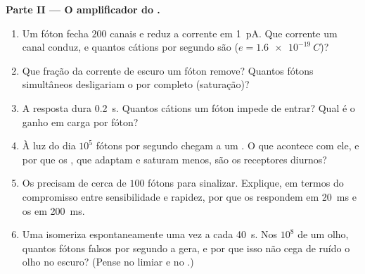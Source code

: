 \begin{problem}
\medskip
\noindent\textbf{Parte II --- O amplificador do .}
\begin{enumerate}[resume]
  \item Um fóton fecha $200$ canais e reduz a corrente em \qty{1}{pA}.
        Que corrente um canal conduz, e quantos cátions por segundo são
        ($e = \qty{1.6e-19}{C}$)?
  \item Que fração da corrente de escuro um fóton remove? Quantos fótons
        simultâneos desligariam o  por completo (saturação)?
  \item A resposta dura \qty{0.2}{s}. Quantos cátions um fóton impede de
        entrar? Qual é o ganho em carga por fóton?
  \item À luz do dia $10^{5}$ fótons por segundo chegam a um . O
        que acontece com ele, e por que os , que adaptam e saturam
        menos, são os receptores diurnos?
  \item Os  precisam de cerca de $100$ fótons para sinalizar.
        Explique, em termos do compromisso entre sensibilidade e
        rapidez, por que os  respondem em \qty{20}{ms} e os
         em \qty{200}{ms}.
  \item Uma  isomeriza espontaneamente uma vez a cada
        \qty{40}{s}. Nos $10^{8}$  de um olho, quantos fótons
        falsos por segundo a  gera, e por que isso não cega de
        ruído o olho no escuro? (Pense no limiar e no .)
\end{enumerate}


\end{problem}
